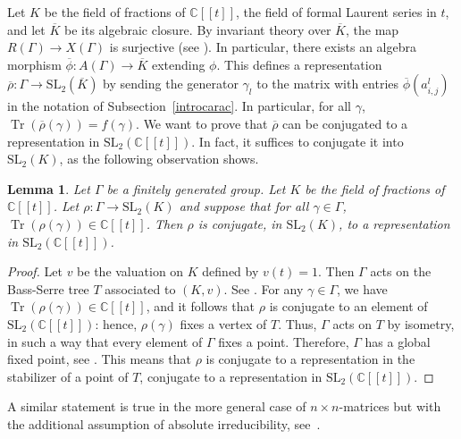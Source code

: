 \documentclass[JEP,XML,SOM,Unicode,NoEqCountersInSection]{cedram}
\newcommand{\lbr}{[\![}
\newcommand{\rbr}{]\!]}
\newtheorem{lemma}[theorem]{Lemma}
\theoremstyle{definition}
\newcommand{\CC}{\mathbb{C}}
\newcommand{\tr}{\operatorname{Tr}}
\newcommand{\SL}{\mathrm{SL}}
\begin{document}
Let $K$ be the field of fractions of $\CC\lbr t\rbr$, \ie 
the field of formal
Laurent series in $t$, and let $\overline{K}$ be its algebraic closure.
By invariant theory over $\overline{K}$, the map $R(\Gamma)\to X(\Gamma)$
is surjective (see \eg \cite[Th.\,5.9]{Mukai}).
In particular, there exists
an algebra morphism $\overline{\phi}\colon A(\Gamma)\to\overline{K}$
extending $\phi$. This defines a representation
$\overline{\rho}\colon\Gamma\to\SL_2(\overline{K})$ by sending the generator
$\gamma_l$ to the matrix with entries $\overline{\phi}(a^l_{i,j})$ in the
notation of Subsection~\ref{introcarac}. In particular, for all $\gamma$,
$\tr(\overline{\rho}(\gamma))=f(\gamma)$. We want to prove that
$\overline{\rho}$ can be conjugated to a representation in $\SL_2(\CC\lbr t\rbr)$.
In fact, it suffices to conjugate it into $\SL_2(K)$, as the following
observation shows.
\begin{lemma}\label{lem:TousEnsemble}
Let $\Gamma$ be a finitely generated group. Let $K$ be the field of
fractions of $\CC\lbr t\rbr$. Let $\rho\colon\Gamma\to\SL_2(K)$ and suppose that
for all $\gamma\in\Gamma$, $\tr(\rho(\gamma))\in\CC\lbr t\rbr$. Then $\rho$ is
conjugate, in $\SL_2(K)$, to a representation in $\SL_2(\CC\lbr t\rbr)$.
\end{lemma}
\begin{proof}
Let $v$ be the valuation on $K$ defined by $v(t)=1$. Then $\Gamma$ acts on
the Bass-Serre tree $T$ associated to $(K,v)$.
See \eg \cite[Chap.\,2]{Serre}.
For any $\gamma\in\Gamma$, we have $\tr(\rho(\gamma))\in\CC\lbr t\rbr$, and
it follows that $\rho$ is conjugate to an element of $\SL_2(\CC\lbr t\rbr)$:
hence, $\rho(\gamma)$ fixes a vertex of $T$.
Thus, $\Gamma$ acts on $T$ by isometry, in such a way that every element
of $\Gamma$ fixes a point. Therefore, $\Gamma$ has a global fixed point,
see \eg \cite[Chap.\,I.6.5, Cor.\,3]{Serre}.
This means that $\rho$ is conjugate to a representation in the stabilizer
of a point of $T$, \ie 
conjugate to a representation in $\SL_2(\CC\lbr t\rbr)$.
\end{proof}
A similar statement is true in the more general case of $n\times n$-matrices
but with the additional assumption of absolute irreducibility,
see~\cite[Lem.\,1.4.3]{CullerShalen}.
\end{document}
